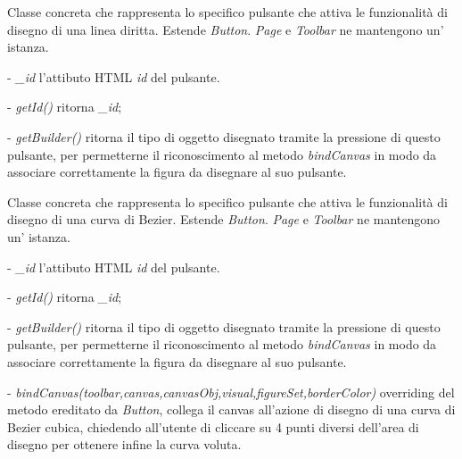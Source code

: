 Classe concreta che rappresenta lo specifico pulsante che attiva le funzionalit\` a di disegno di una linea diritta.
Estende \textit{Button}.
\textit{Page} e \textit{Toolbar} ne mantengono un' istanza.
\begin{elencopuntato}[\subsubsecindent]
\item[-] \textit{{\_}id} l'attibuto HTML \textit{id} del pulsante.
\end{elencopuntato}
\begin{elencopuntato}[\subsubsecindent]
\item[-] \textit{getId()} ritorna \textit{{\_}id};
\item[-] \textit{getBuilder()} ritorna il tipo di oggetto disegnato tramite la pressione di questo pulsante, per permetterne il riconoscimento al metodo \textit{bindCanvas} in modo da associare correttamente la figura da disegnare al suo pulsante.
\end{elencopuntato}

Classe concreta che rappresenta lo specifico pulsante che attiva le funzionalit\` a di disegno di una curva di Bezier.
Estende \textit{Button}.
\textit{Page} e \textit{Toolbar} ne mantengono un' istanza.
\begin{elencopuntato}[\subsubsecindent]
\item[-] \textit{{\_}id} l'attibuto HTML \textit{id} del pulsante.
\end{elencopuntato}
\begin{elencopuntato}[\subsubsecindent]
\item[-] \textit{getId()} ritorna \textit{{\_}id};
\item[-] \textit{getBuilder()} ritorna il tipo di oggetto disegnato tramite la pressione di questo pulsante, per permetterne il riconoscimento al metodo \textit{bindCanvas} in modo da associare correttamente la figura da disegnare al suo pulsante.
\item[-]  \textit{bindCanvas(toolbar,canvas,canvasObj,visual,figureSet,borderColor)} overriding del metodo ereditato da \textit{Button}, collega il canvas all'azione di disegno di una curva di Bezier cubica,  chiedendo all'utente di cliccare su 4 punti diversi dell'area di disegno per ottenere infine la curva voluta.
\end{elencopuntato}

